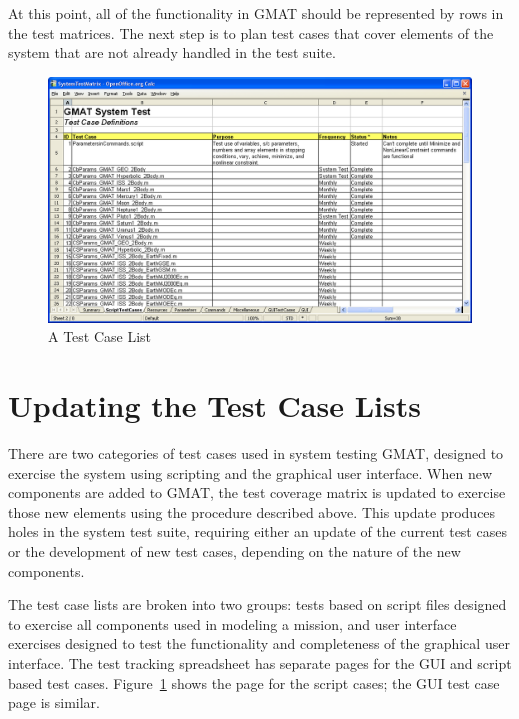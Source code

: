 At this point, all of the functionality in GMAT should be represented by rows in the test matrices.
The next step is to plan test cases that cover elements of the system that are not already handled
in the test suite.

\begin{figure}[h!]
\begin{center}
\includegraphics[460,289]{Images/TestCaseTable.png}
\caption{\label{figure:TestCaseTable}A Test Case List}
\end{center}
\end{figure}

\section{Updating the Test Case Lists}

There are two categories of test cases used in system testing GMAT, designed to exercise the system
using scripting and the graphical user interface.  When new components are added to GMAT, the test
coverage matrix is updated to exercise those new elements using the procedure described above.  This
update produces holes in the system test suite, requiring either an update of the current test cases
or the development of new test cases, depending on the nature of the new components.

The test case lists are broken into two groups: tests based on script files designed to exercise all
components used in modeling a mission, and user interface exercises designed to test the
functionality and completeness of the graphical user interface.  The test tracking spreadsheet has
separate pages for the GUI and script based test cases.  Figure~\ref{figure:TestCaseTable} shows the
page for the script cases; the GUI test case page is similar.

